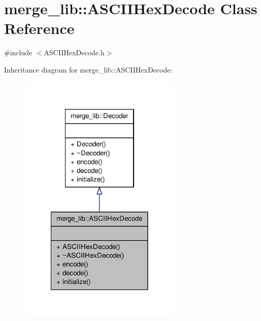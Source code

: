 \hypertarget{classmerge__lib_1_1_a_s_c_i_i_hex_decode}{\section{merge\-\_\-lib\-:\-:A\-S\-C\-I\-I\-Hex\-Decode Class Reference}
\label{da/d7d/classmerge__lib_1_1_a_s_c_i_i_hex_decode}
}


{\ttfamily \#include $<$A\-S\-C\-I\-I\-Hex\-Decode.\-h$>$}



Inheritance diagram for merge\-\_\-lib\-:\-:A\-S\-C\-I\-I\-Hex\-Decode\-:
\nopagebreak
\begin{figure}[H]
\begin{center}
\leavevmode
\includegraphics[width=222pt]{d6/dd7/classmerge__lib_1_1_a_s_c_i_i_hex_decode__inherit__graph}
\end{center}
\end{figure}



